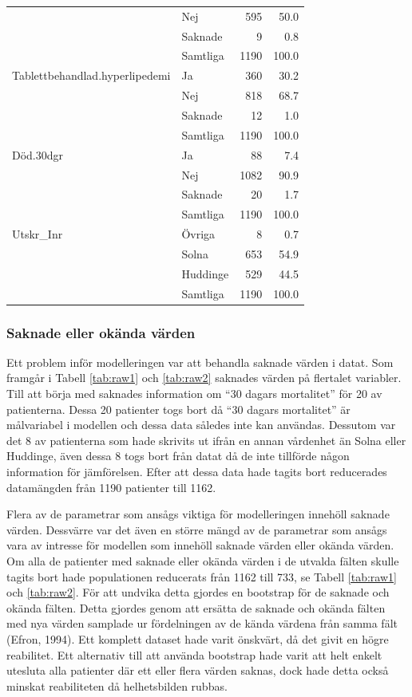\begin{table}[htbp]
{\begin{tabular}{ll|rr}
   & Nej & 595 & 50.0 \\ 
   & Saknade & 9 & 0.8 \\ 
   \hline
 & Samtliga & 1190 & 100.0 \\ 
   \hline
\hline
Tablettbehandlad.hyperlipedemi & Ja & 360 & 30.2 \\ 
   & Nej & 818 & 68.7 \\ 
   & Saknade & 12 & 1.0 \\ 
   \hline
 & Samtliga & 1190 & 100.0 \\ 
   \hline
\hline
Död.30dgr & Ja & 88 & 7.4 \\ 
   & Nej & 1082 & 90.9 \\ 
   & Saknade & 20 & 1.7 \\ 
   \hline
 & Samtliga & 1190 & 100.0 \\ 
   \hline
\hline
Utskr\_Inr & Övriga & 8 & 0.7 \\ 
   & Solna & 653 & 54.9 \\ 
   & Huddinge & 529 & 44.5 \\ 
   \hline
 & Samtliga & 1190 & 100.0 \\ 
   \hline
\hline
\end{tabular}
}

\end{table}


\subsubsection{Saknade eller okända värden}
Ett problem inför modelleringen var att behandla saknade värden i datat. Som framgår i Tabell \ref{tab:raw1} och \ref{tab:raw2} saknades värden på flertalet variabler. Till att börja med saknades information om “30 dagars mortalitet” för 20 av patienterna. Dessa 20 patienter togs bort då “30 dagars mortalitet” är målvariabel i modellen och dessa data således inte kan användas. Dessutom var det 8 av patienterna som hade skrivits ut ifrån en annan vårdenhet än Solna eller Huddinge, även dessa 8 togs bort från datat då de inte tillförde någon information för jämförelsen. Efter att dessa data hade tagits bort reducerades datamängden från 1190 patienter till 1162.

\newpage

Flera av de parametrar som ansågs viktiga för modelleringen innehöll  saknade värden. Dessvärre var det även en större mängd av de parametrar som ansågs vara av intresse för modellen som innehöll saknade värden eller okända värden. Om alla de patienter med saknade eller okända värden i de utvalda fälten skulle tagits bort hade populationen reducerats från 1162 till 733, se Tabell \ref{tab:raw1} och \ref{tab:raw2}. För att undvika detta gjordes en bootstrap för de saknade och okända fälten. Detta gjordes genom att ersätta de saknade och okända fälten med nya värden samplade ur fördelningen av de kända värdena från samma fält (Efron, 1994). Ett komplett dataset hade varit önskvärt, då det givit en högre reabilitet. Ett alternativ till att använda bootstrap hade varit att helt enkelt utesluta alla patienter där ett eller flera värden saknas, dock hade detta också minskat reabiliteten då helhetsbilden rubbas. 

